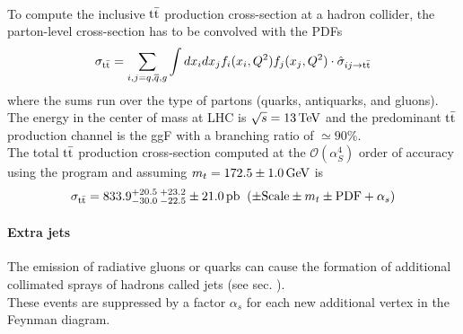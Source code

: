 \\
To compute the inclusive ${{\text{t}}{\bar{\text{t}}}}$ production cross-section at a hadron collider, the parton-level cross-section has to be convolved with the PDFs
\begin{equation}
    \sigma_{\mathrm{t\bar{t}}}=\sum_{i,j=q,\overline{{{q}}},g}\int d x_{i}d x_{j}f_{i}(x_{i},Q^{2})f_{j}(x_{j},Q^{2})\cdot\hat{\sigma}_{i j\rightarrow {\ensuremath{{\text{t}}{\bar{\text{t}}}}}}
\end{equation}
where the sums run over the type of partons (quarks, antiquarks, and gluons).
The energy in the center of mass at LHC is $\sqrt{s}=13 {\,\text{Te\hspace{-.08em}V}}$ and the predominant ${{\text{t}}{\bar{\text{t}}}}$ production channel is the ggF with a branching ratio of $\simeq 90\%$.\\
The total ${{\text{t}}{\bar{\text{t}}}}$ production cross-section computed at the $\mathcal{O} (\alpha_S^4)$ order of accuracy using the program \Toppp \cite{Czakon2014Top++:Colliders} and assuming $m_t=172.5 \pm 1.0 {\,\text{Ge\hspace{-.08em}V}}$ is  \cite{TtbarNNLOTWiki}
\begin{equation}
    \sigma_{{\text{t}}{\bar{\text{t}}}} = 833.9^{+20.5}_{-30.0}\, ^{+23.2}_{-22.5}\pm 21.0\,  \text{pb}\; \; (\pm \text{Scale} \pm m_t \pm \text{PDF}+\alpha_s)
\end{equation}
\paragraph*{Extra jets}
The emission of radiative gluons or quarks can cause the formation of additional collimated sprays of hadrons called jets (see sec. \ADDREF).\\
These events are suppressed by a factor $\alpha_s$ for each new additional vertex in the Feynman diagram.

